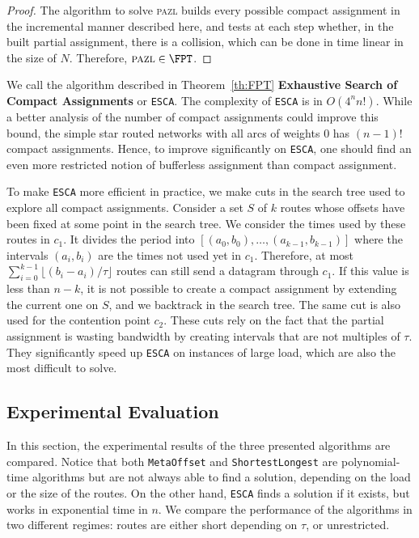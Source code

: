 \documentclass[a4paper,10pt]{journal}
\newcommand\shortestlongest{\texttt{ShortestLongest}\xspace}
\newcommand\metaoffset{\texttt{MetaOffset}\xspace}
\newcommand\ESCA{\texttt{ESCA}\xspace}
\newcommand\pazl{\textsc{pazl}\xspace}
\begin{document}
\begin{proof}
The algorithm to solve \pazl builds every possible compact assignment in the incremental manner described here, and tests at each step whether, in the built partial assignment, there is a collision, which can be done in time linear in the size of $N$. Therefore, $\pazl \in \FPT$.
\end{proof}


We call the algorithm described in Theorem~\ref{th:FPT} \textbf{Exhaustive Search of Compact Assignments}
or \ESCA. The complexity of \ESCA is in $O(4^n n!)$. While a better analysis
of the number of compact assignments could improve this bound, the simple star routed networks with all arcs of weights $0$ has $(n-1)!$ compact assignments. Hence, to improve significantly on \ESCA, one should find an even more restricted notion of bufferless assignment than compact assignment.

To make \ESCA more efficient in practice, we make cuts in the search tree used to explore all compact assignments. Consider a set $S$ of $k$ routes whose offsets have been fixed at some point in the search tree. We consider the times used by these routes in $c_1$. It divides the period into $[(a_0,b_0), \dots, (a_{k-1},b_{k-1})]$ where the intervals $(a_i,b_i)$ are the times not used yet in $c_1$. Therefore, at most $\displaystyle{ \sum_{i=0}^{k-1} \lfloor(b_{i} -a_i)/\tau\rfloor}$ routes can still send a datagram through $c_1$. If this value is less than $n - k$, it is not possible to create a compact assignment by extending the current one on $S$, and we backtrack in the search tree. The same cut is also used for the contention point $c_2$. These cuts rely on the fact that the partial assignment is wasting bandwidth by creating intervals that are not multiples of $\tau$. They significantly speed up \ESCA on instances of large load, which are also the most difficult to solve.


   \subsection{Experimental Evaluation}\label{sec:exp_PAZL}

   
  In this section, the experimental results of the three presented algorithms are compared.
   Notice that both \metaoffset and \shortestlongest are polynomial-time algorithms but are not always able to find a solution, depending on the load or the size of the routes. On the other hand, \ESCA finds a solution if it exists, but works in exponential time in $n$. We compare the performance of the algorithms in two different regimes: routes are either short depending on $\tau$, or unrestricted.
\end{document}
